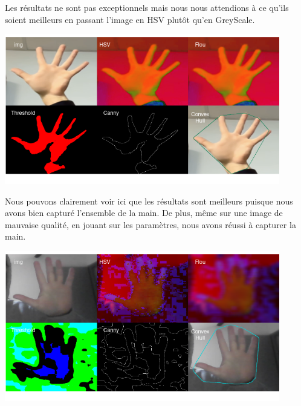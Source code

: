 \documentclass[11pt]{article}
\begin{document}
Les résultats ne sont pas exceptionnels mais nous nous attendions à ce qu'ils soient meilleurs en passant l'image en HSV plutôt qu'en GreyScale.
\begin{center}
    \includegraphics[width=0.9\textwidth]{images/pre_ttt_4.png}
\end{center}
\bigbreak
\newpage
Nous pouvons clairement voir ici que les résultats sont meilleurs puisque nous avons bien capturé l'ensemble de la main. De plus, même sur une image de mauvaise qualité, en jouant sur les paramètres, nous avons réussi à capturer la main.
\begin{center}
    \includegraphics[width=0.9\textwidth]{images/pre_ttt_5.png}
    \end{center}
\bigbreak
\end{document}
